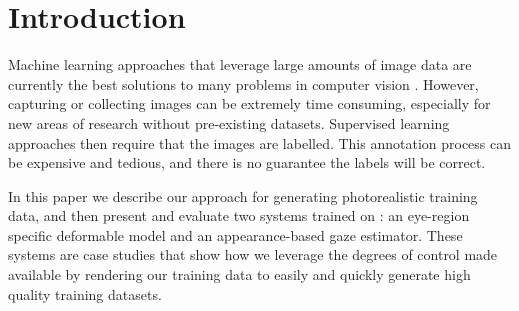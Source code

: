 
\section{Introduction}

Machine learning approaches that leverage large amounts of image data are currently the best solutions to many problems in computer vision . However, capturing or collecting images can be extremely time consuming, especially for new areas of research without pre-existing datasets. Supervised learning approaches then require that the images are labelled. This annotation process can be expensive and tedious, and there is no guarantee the labels will be correct.

In this paper we describe our approach for generating photorealistic training data, and then present and evaluate two systems trained on \dataset: an eye-region specific deformable model and an appearance-based gaze estimator. These systems are case studies that show how we leverage the degrees of control made available by rendering our training data to easily and quickly generate high quality training datasets.